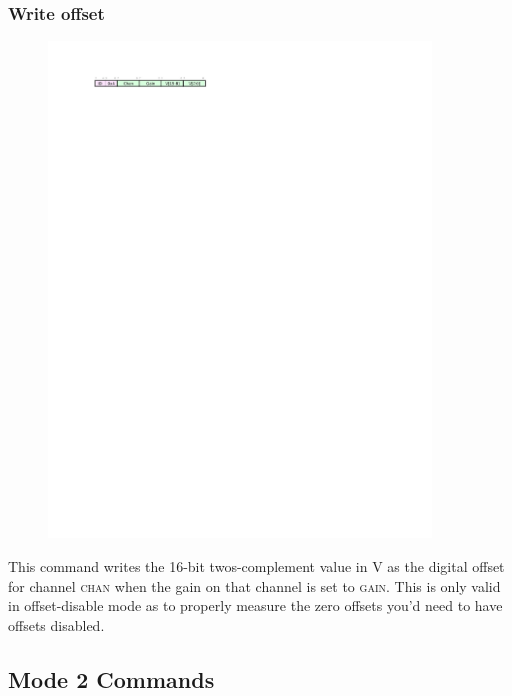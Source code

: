 \subsubsection{Write offset}
\begin{figure}[h!]
\includegraphics[width=4in]{writeos.cmd.svg}
\end{figure}

This command writes the 16-bit twos-complement value in V as the digital offset for channel \textsc{chan} when the gain on that channel is set to \textsc{gain}. This is only valid in offset-disable mode as to properly measure the zero offsets you'd need to have offsets disabled. 

\subsection{Mode 2 Commands}
